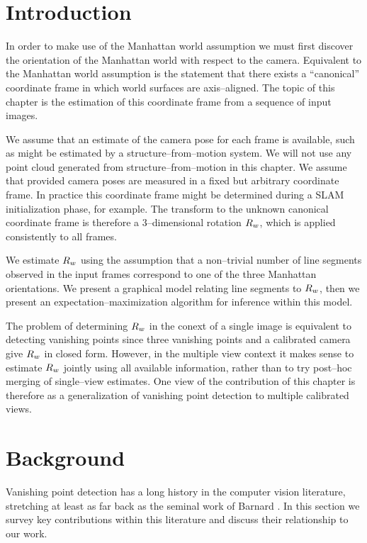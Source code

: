 \section{Introduction}

In order to make use of the Manhattan world assumption we must first
discover the orientation of the Manhattan world with respect to the
camera. Equivalent to the Manhattan world assumption is the statement
that there exists a ``canonical'' coordinate frame in which world
surfaces are axis--aligned. The topic of this chapter is the
estimation of this coordinate frame from a sequence of input images. 

We assume that an estimate of the camera pose for each frame is
available, such as might be estimated by a structure--from--motion
system. We will not use any point cloud generated from
structure--from--motion in this chapter. We assume that provided
camera poses are measured in a fixed but arbitrary coordinate
frame. In practice this coordinate frame might be determined during a
SLAM initialization phase, for example. The transform to the unknown
canonical coordinate frame is therefore a 3--dimensional rotation
$\SceneR$, which is applied consistently to all frames.

We estimate $\SceneR$ using the assumption that a non--trivial number
of line segments observed in the input frames correspond to one of the
three Manhattan orientations. We present a graphical model relating
line segments to $\SceneR$, then we present an
expectation--maximization algorithm for inference within this model.

The problem of determining $\SceneR$ in the conext of a single image
is equivalent to detecting vanishing points since three vanishing
points and a calibrated camera give $\SceneR$ in closed form. However,
in the multiple view context it makes sense to estimate $\SceneR$
jointly using all available information, rather than to try post--hoc
merging of single--view estimates. One view of the contribution of
this chapter is therefore as a generalization of vanishing point
detection to multiple calibrated views.

\section{Background}

Vanishing point detection has a long history in the computer vision
literature, stretching at least as far back as the seminal work of
Barnard \etal \cite{Barnard83}. In this section we survey key
contributions within this literature and discuss their relationship to
our work.

